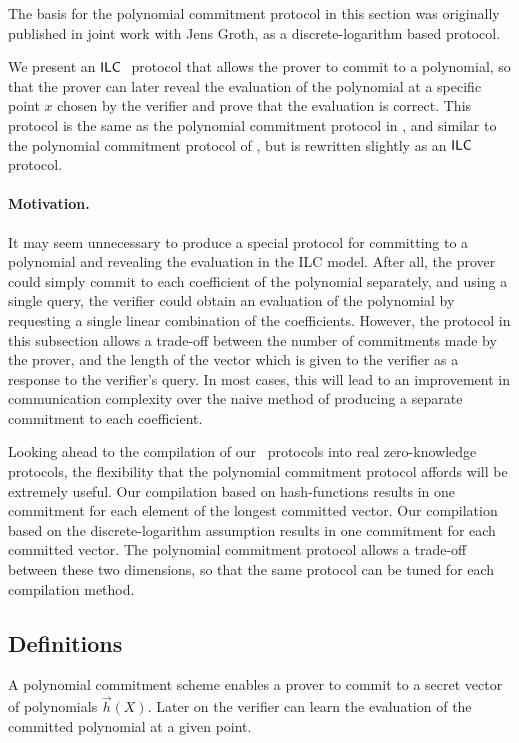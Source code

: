 The basis for the polynomial commitment protocol in this section was originally published in joint work \cite{BootleG18} with Jens Groth, as a discrete-logarithm based protocol.

We present an $\mathsf{ILC}~$ protocol that allows the prover to commit to a polynomial, so that the prover can later reveal the evaluation of the polynomial at a specific point $x$ chosen by the verifier and prove that the evaluation is correct. This protocol is the same as the polynomial commitment protocol in \cite{BootleG18}, and similar to the polynomial commitment protocol of \cite{BootleCCGP16}, but is rewritten slightly as an $\mathsf{ILC}~$ protocol.

\paragraph{Motivation.} It may seem unnecessary to produce a special protocol for committing to a polynomial and revealing the evaluation in the ILC model. After all, the prover could simply commit to each coefficient of the polynomial separately, and using a single query, the verifier could obtain an evaluation of the polynomial by requesting a single linear combination of the coefficients. However, the protocol in this subsection allows a trade-off between the number of commitments made by the prover, and the length of the vector which is given to the verifier as a response to the verifier's query. In most cases, this will lead to an improvement in communication complexity over the naive method of producing a separate commitment to each coefficient.

Looking ahead to the compilation of our \ILC\ protocols into real zero-knowledge protocols, the flexibility that the polynomial commitment protocol affords will be extremely useful. Our compilation based on hash-functions results in one commitment for each element of the longest committed vector. Our compilation based on the discrete-logarithm assumption results in one commitment for each committed vector. The polynomial commitment protocol allows a trade-off between these two dimensions, so that the same protocol can be tuned for each compilation method.

\subsection{Definitions}
A polynomial commitment scheme enables a prover to commit to a secret vector of polynomials $\vec{h}(X)$. Later on the verifier can learn the evaluation of the committed polynomial at a given point.

